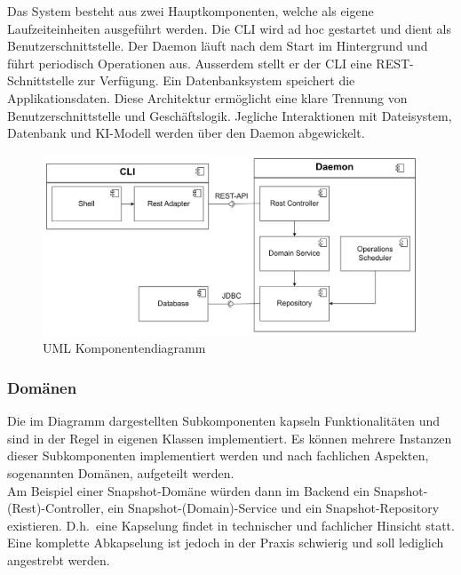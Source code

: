 \documentclass[a4paper,12pt]{report}
\begin{document}
    Das System besteht aus zwei Hauptkomponenten, welche als eigene Laufzeiteinheiten ausgeführt werden.
    Die CLI wird ad hoc gestartet und dient als Benutzerschnittstelle.
    Der Daemon läuft nach dem Start im Hintergrund und führt periodisch Operationen aus.
    Ausserdem stellt er der
    CLI eine REST-Schnittstelle zur Verfügung.
    Ein Datenbanksystem speichert die Applikationsdaten.
    Diese Architektur ermöglicht eine klare Trennung von Benutzerschnittstelle und Geschäftslogik.
    Jegliche Interaktionen mit Dateisystem, Datenbank und KI-Modell werden über den Daemon abgewickelt.

    \begin{figure}[h]
        \centering
        \includegraphics[width=1\textwidth]{assets/comp-diag-tracesentry-v3}
        \caption{UML Komponentendiagramm}
        \label{fig:comp-diag}
        \vspace{2em}
    \end{figure}

    \subsubsection{Domänen}\label{subsubsec:domaenen}
    Die im Diagramm dargestellten Subkomponenten kapseln Funktionalitäten und sind in der Regel in eigenen Klassen implementiert.
    Es können mehrere Instanzen dieser Subkomponenten implementiert werden und nach fachlichen Aspekten, sogenannten Domänen, aufgeteilt werden.
    \\Am Beispiel einer Snapshot-Domäne würden dann im Backend ein Snapshot-(Rest)-Controller, ein Snapshot-(Domain)-Service und ein Snapshot-Repository existieren.
    D.h.\ eine Kapselung findet in technischer und fachlicher Hinsicht statt.
    Eine komplette Abkapselung ist jedoch in der Praxis schwierig und soll lediglich angestrebt werden.\\
\end{document}

